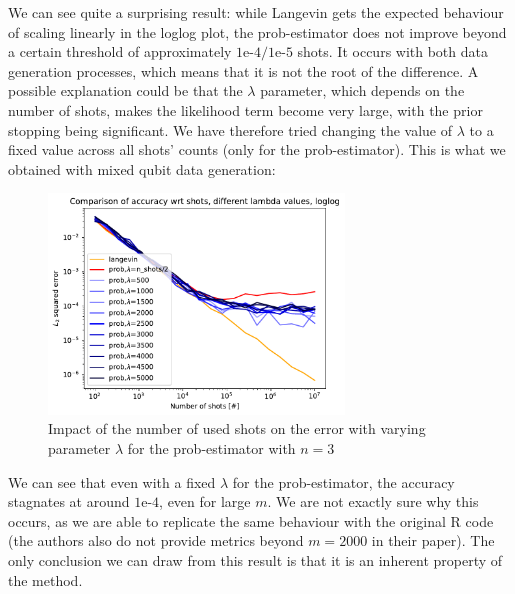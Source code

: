 \documentclass[12pt]{memoir}
\begin{document}
We can see quite a surprising result: while Langevin gets the expected behaviour of scaling linearly in the loglog plot, the prob-estimator does not improve beyond a certain threshold of approximately $1\text{e-}4/1\text{e-}5$ shots. It occurs with both data generation processes, which means that it is not the root of the difference. A possible explanation could be that the $\lambda$ parameter, which depends on the number of shots, makes the likelihood term become very large, with the prior stopping being significant. We have therefore tried changing the value of $\lambda$ to a fixed value across all shots' counts (only for the prob-estimator). This is what we obtained with mixed qubit data generation:

\begin{figure}[H]
    \centering
    \includegraphics[width=0.7\textwidth]{figures/experiments/shots/shots_acc_comp_shots_exp_lambda_prob_with_var_lambda_loglog-1.png}
    \caption{Impact of the number of used shots on the error with varying parameter $\lambda$ for the prob-estimator with $n=3$}
    \label{fig:shots-comp-prob-var-lambda}
\end{figure}

We can see that even with a fixed $\lambda$ for the prob-estimator, the accuracy stagnates at around $1\text{e-}4$, even for large $m$. We are not exactly sure why this occurs, as we are able to replicate the same behaviour with the original R code (the authors also do not provide metrics beyond $m=2000$ in their paper). The only conclusion we can draw from this result is that it is an inherent property of the method.
\end{document}

